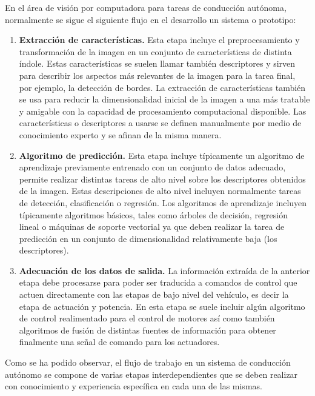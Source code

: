 \documentclass[12pt,letterpaper]{article}
\begin{document}
En el área de visión por computadora para tareas de conducción autónoma, normalmente se sigue el siguiente flujo en el desarrollo 
un sistema o prototipo:

\begin{enumerate}
    \item \textbf{Extracción de características.} Esta etapa incluye el preprocesamiento y transformación de la imagen 
    en un conjunto de características de distinta índole. Estas características se suelen llamar también descriptores 
    y sirven para describir los aspectos más relevantes de la imagen para la tarea final, por ejemplo, la detección de bordes. 
    La extracción de características también se usa para reducir la dimensionalidad inicial de la imagen a una más tratable y 
    amigable con la capacidad de procesamiento computacional disponible. Las características o descriptores a usarse 
    se definen manualmente por medio de conocimiento experto y se afinan de la misma manera.

    \item \textbf{Algoritmo de predicción.} Esta etapa incluye típicamente un algoritmo de aprendizaje previamente 
    entrenado con un conjunto de datos adecuado, permite realizar distintas tareas de alto nivel sobre los descriptores 
    obtenidos de la imagen. Estas descripciones de alto nivel incluyen normalmente tareas de detección, 
    clasificación o regresión. Los algoritmos de aprendizaje incluyen típicamente algoritmos básicos, tales como árboles de decisión,
    regresión lineal o máquinas de soporte vectorial ya que deben realizar la tarea de predicción en un 
    conjunto de dimensionalidad relativamente baja (los descriptores).

    \item \textbf{Adecuación de los datos de salida.} La información extraída de la anterior etapa debe 
    procesarse para poder ser traducida a comandos de control que actuen directamente con las etapas 
    de bajo nivel del vehículo, es decir la etapa de actuación y potencia. En esta etapa se suele incluir algún algoritmo 
    de control realimentado para el control de motores así como también algoritmos de fusión de distintas fuentes de información
    para obtener finalmente una señal de comando para los actuadores.
\end{enumerate}

Como se ha podido observar, el flujo de trabajo en un sistema de conducción autónomo se compone de varias etapas 
interdependientes que se deben realizar con conocimiento y experiencia específica en cada una de las mismas. 
\end{document}
